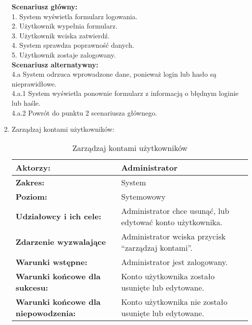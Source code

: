 \begin{enumerate}[label=(\Roman*)]
\textbf{Scenariusz główny:}\\
1. System wyświetla formularz logowania.\\
2. Użytkownik wypełnia formularz.\\
3. Użytkownik wciska zatwierdź.\\
4. System sprawdza poprawność danych.\\
5. Użytkownik zostaje zalogowany.\\
\textbf{Scenariusz alternatywny:}\\
4.a System odrzuca wprowadzone dane, ponieważ login lub hasło są nieprawidłowe.\\
4.a.1 System wyświetla ponownie formularz z informacją o błędnym loginie lub haśle.\\
4.a.2 Powrót do punktu 2 scenariusza głównego.\\

\item Zarządzaj kontami użytkowników:
	\begin{table}[h]
\centering
\caption{Zarządzaj kontami użytkowników}
\label{zku}
\begin{tabular}{|p{7cm}|p{7cm}|}
  \hline 
  \textbf{Aktorzy:} & Administrator\\
  \hline
  \textbf{Zakres:} & System \\
	\hline
  \textbf{Poziom:} & Sytemowowy \\
	\hline
  \textbf{Udziałowcy i ich cele: } & Administrator chce usunąć, lub edytować konto użytkownika.
 \\
	\hline
  \textbf{Zdarzenie wyzwalające } & Administrator wciska przycisk “zarządzaj kontami”.
\\
	\hline
  \textbf{Warunki wstępne: } & Administrator jest zalogowany. \\
	\hline
  \textbf{Warunki końcowe dla sukcesu:} & Konto użytkownika zostało usunięte lub edytowane.\\
	\hline
  \textbf{Warunki końcowe dla niepowodzenia:} &  Konto użytkownika nie zostało usunięte lub edytowane. \\
  \hline
\end{tabular} 
\end{table}


\end{enumerate}
